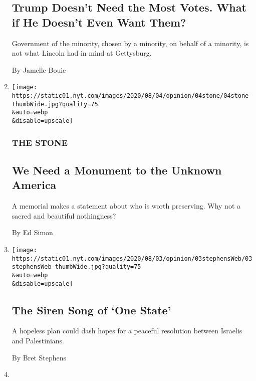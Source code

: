 \begin{enumerate}
  \hypertarget{trump-doesnt-need-the-most-votes-what-if-he-doesnt-even-want-them}{%
  \subsection{Trump Doesn't Need the Most Votes. What if He Doesn't Even
  Want
  Them?}\label{trump-doesnt-need-the-most-votes-what-if-he-doesnt-even-want-them}}

  Government of the minority, chosen by a minority, on behalf of a
  minority, is not what Lincoln had in mind at Gettysburg.

  By Jamelle Bouie
\item
  \href{/2020/08/04/opinion/us-monuments-rome-unknown-god.html}{}

  \texttt{[image: https://static01.nyt.com/images/2020/08/04/opinion/04stone/04stone-thumbWide.jpg?quality=75\\\&auto=webp\\\&disable=upscale]}

  \hypertarget{the-stone}{%
  \subsubsection{THE STONE}\label{the-stone}}

  \hypertarget{we-need-a-monument-to-the-unknown-america}{%
  \subsection{We Need a Monument to the Unknown
  America}\label{we-need-a-monument-to-the-unknown-america}}

  A memorial makes a statement about who is worth preserving. Why not a
  sacred and beautiful nothingness?

  By Ed Simon
\item
  \href{/2020/08/03/opinion/israel-palestine-one-state-solution.html}{}

  \texttt{[image: https://static01.nyt.com/images/2020/08/03/opinion/03stephensWeb/03stephensWeb-thumbWide.jpg?quality=75\\\&auto=webp\\\&disable=upscale]}

  \hypertarget{the-siren-song-of-one-state}{%
  \subsection{The Siren Song of `One
  State'}\label{the-siren-song-of-one-state}}

  A hopeless plan could dash hopes for a peaceful resolution between
  Israelis and Palestinians.

  By Bret Stephens
\item
  \href{/2020/08/03/opinion/senior-voters-biden-trump-2020.html}{}


\end{enumerate}
